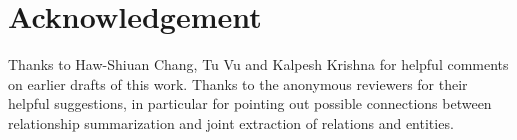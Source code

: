\documentclass[11pt,a4paper]{article}
\begin{document}
\section{Acknowledgement}
Thanks to Haw-Shiuan Chang, Tu Vu and Kalpesh Krishna for helpful comments on earlier drafts of this work. Thanks to the anonymous reviewers for their helpful suggestions, in particular for pointing out possible connections between relationship summarization and joint extraction of relations and entities.




\end{document}
